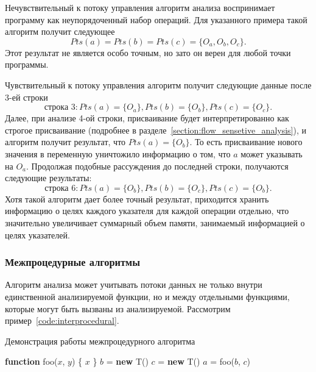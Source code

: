 \documentclass[14pt,titlepage]{extarticle}
\newcommand{\NEW}{\textbf{new }}
\newcommand{\FUNCTION}{\textbf{function }}
\begin{document}
        Нечувствительный к потоку управления алгоритм анализа воспринимает
        программу как неупорядоченный набор операций.
        Для указанного примера такой алгоритм получит следующее
        \[Pts(a) = Pts(b) = Pts(c) = \{O_a, O_b, O_c\}.\]
        Этот результат не является особо точным, но зато он верен
        для любой точки программы.

        Чувствительный к потоку управления алгоритм получит следующие данные
        после 3-ей строки
        \[\textrm{строка 3}:
            Pts(a) = \{O_a\}, Pts(b) = \{O_b\}, Pts(c) = \{O_c\}.\]
        Далее, при анализе 4-ой строки, присваивание будет интерпретированно
        как строгое присваивание (подробнее в
        разделе~\ref{section:flow_sensetive_analysis}), и алгоритм получит
        результат, что $Pts(a) = \{O_b\}$. То есть присваивание нового значения
        в переменную уничтожило информацию о том, что $a$ может указывать на
        $O_a$. Продолжая подобные рассуждения до последней строки, получаются
        следующие результаты:
        \[\textrm{строка 6}:
            Pts(a) = \{O_b\}, Pts(b) = \{O_c\}, Pts(c) = \{O_b\}.\]
        Хотя такой алгоритм дает более точный результат, приходится хранить
        информацию о целях каждого указателя для каждой операции отдельно,
        что значительно увеличивает суммарный объем памяти, занимаемый
        информацией о целях указателей.

      \subsubsection{Межпроцедурные алгоритмы}

        Алгоритм анализа может учитывать потоки данных не только внутри
        единственной анализируемой функции, но и между отдельными функциями,
        которые могут быть вызваны из анализируемой.
        Рассмотрим пример~\ref{code:interprocedural}.
        \begin{algorithm}
          \caption{Демонстрация работы межпроцедурного алгоритма}
          \label{code:interprocedural}
          \begin{algorithmic}[1]
            \STATE \FUNCTION foo($x$, $y$) \{
            \RETURN $x$
            \STATE \}
            \STATE
            \STATE $b$ = \NEW T()
            \STATE $c$ = \NEW T()
            \STATE $a$ = foo($b$, $c$)
          \end{algorithmic}
        \end{algorithm}
\end{document}
